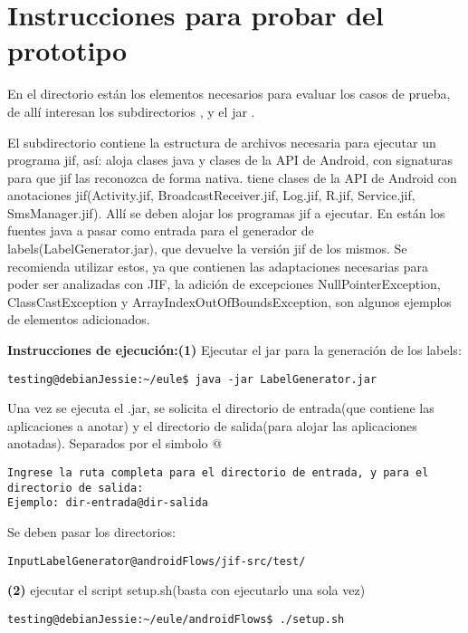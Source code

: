 \section{Instrucciones para probar del prototipo}
En el directorio \small{} están los elementos
necesarios para evaluar los casos de prueba, de allí interesan los
subdirectorios \small{},
\small{} y el jar
\small{}.

El subdirectorio \small{} contiene la estructura de
archivos necesaria para ejecutar un programa jif, así:
\small{} aloja clases java y clases de la API de Android, con
signaturas para que jif las reconozca de forma nativa.
\small{} tiene clases de la API de Android con
anotaciones jif(Activity.jif, BroadcastReceiver.jif, Log.jif, R.jif,
Service.jif, SmsManager.jif). Allí se deben alojar los programas jif a
ejecutar.\newline 
En {\small{}} están los fuentes java a pasar como
entrada para el generador de labels(LabelGenerator.jar), que devuelve la
versión jif de los mismos. Se recomienda utilizar estos, ya que contienen las
adaptaciones necesarias para poder ser analizadas con JIF, la adición de
excepciones NullPointerException, ClassCastException y
ArrayIndexOutOfBoundsException, son algunos ejemplos de elementos adicionados.

 \textbf{Instrucciones de
ejecución:}\newline \textbf{(1)} Ejecutar el jar para la generación de los labels:
\begin{lstlisting}
testing@debianJessie:~/eule$ java -jar LabelGenerator.jar
\end{lstlisting}
Una vez se ejecuta el .jar, se solicita el directorio de entrada(que contiene
las aplicaciones a anotar) y el directorio de salida(para alojar las
aplicaciones anotadas). Separados por el simbolo @
\begin{lstlisting}
Ingrese la ruta completa para el directorio de entrada, y para el 
directorio de salida:
Ejemplo: dir-entrada@dir-salida 
\end{lstlisting}
Se deben pasar los directorios:
\begin{lstlisting}
InputLabelGenerator@androidFlows/jif-src/test/
\end{lstlisting}

\textbf{(2)} ejecutar el script setup.sh(basta con ejecutarlo una sola vez)
\begin{lstlisting}
testing@debianJessie:~/eule/androidFlows$ ./setup.sh
\end{lstlisting}

